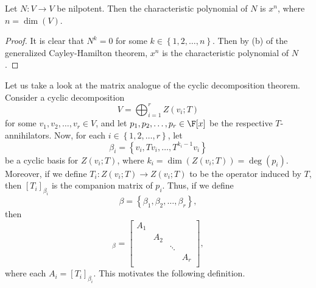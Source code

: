 \documentclass[linearalgebra]{subfiles}
\begin{document}
    \begin{cor}{}
        Let $N:V\to V$ be nilpotent. Then the characteristic polynomial of $N$ is $x^n$, where $n=\dim(V)$.
    \end{cor}	

    \begin{proof}
        It is clear that $N^k=0$ for some $k\in\left\lbrace 1,2,\ldots,n \right\rbrace $. Then by (b) of the generalized Cayley-Hamilton theorem, $x^n$ is the characteristic polynomial of $N$.
    \end{proof}
    
    \begin{remark}
        Let us take a look at the matrix analogue of the cyclic decomposition theorem. Consider a cyclic decomposition
        \begin{equation*}
            V = \bigoplus^{r}_{i=1} Z\left( v_i;T \right) 
        \end{equation*}
        for some $v_1,v_2,\ldots,v_r\in V$, and let $p_1,p_2,\ldots,p_r\in\F[x]$ be the respective $T$-annihilators. Now, for each $i\in \left\lbrace 1,2,\ldots,r \right\rbrace $, let
        \begin{equation*}
            \beta_i = \left\lbrace v_i, Tv_i, \ldots, T^{k_i-1}v_i \right\rbrace 
        \end{equation*}
        be a cyclic basis for $Z\left( v_i;T \right)$, where $k_i=\dim\left( Z\left( v_i;T \right)  \right) = \deg\left( p_i \right)$. Moreover, if we define $T_i:Z\left( v_i;T \right) \to Z\left( v_i;T \right)$ to be the operator induced by $T$, then $\left[ T_i \right] _{\beta_i}$ is the companion matrix of $p_i$. Thus, if we define
        \begin{equation*}
            \beta = \left\lbrace \beta_1,\beta_2, \ldots,\beta_r \right\rbrace ,
        \end{equation*}
        then
        \begin{equation*}
            [T]_\beta = 
            \begin{bmatrix}
                A_1 & & & \\
                & A_2 & & \\
                & & \ddots & \\
                & & & A_r\\
            \end{bmatrix},
        \end{equation*}
        where each $A_i = \left[ T_i \right] _{\beta_i}$. This motivates the following definition.
    \end{remark}
\end{document}
